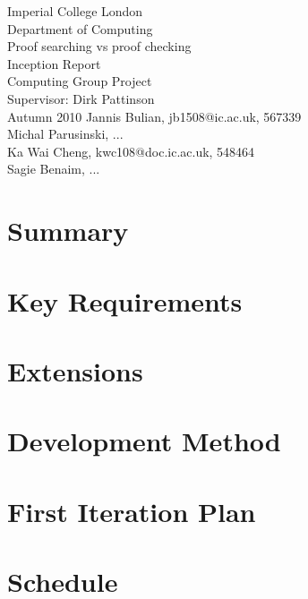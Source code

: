 \documentclass[12pt,a4paper]{scrartcl}
\begin{document}
\thispagestyle{empty}
\begin{titlepage}
  \begin{center}
    \vspace*{\fill}
            {{\Large Imperial College London\\ Department of Computing\\}}
            \vfill {{\Huge Proof searching vs proof checking \\
                     Inception Report}}\\
            \vfill {{\large Computing Group Project\\ 
                Supervisor: Dirk Pattinson\\ Autumn 2010}}
            \vfill {Jannis Bulian, jb1508@ic.ac.uk, 567339 \\
                    Michal Parusinski, ... \\
                    Ka Wai Cheng, kwc108@doc.ic.ac.uk, 548464\\
                    Sagie Benaim, ...}
  \end{center}
\end{titlepage}

\newpage

\tableofcontents
\thispagestyle{empty}

\newpage

\section{Summary}


\section{Key Requirements}


\section{Extensions}


\section{Development Method}


\section{First Iteration Plan}


\section{Schedule}

\end{document}
